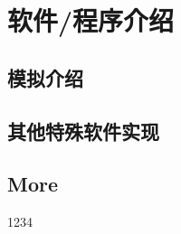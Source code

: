 \documentclass{ctexart}
\begin{document}
\section{软件/程序介绍}

\subsection{模拟介绍}

\subsection{其他特殊软件实现}

\subsection{More}



\begin{appendices}
1234
\end{appendices}
\end{document}
